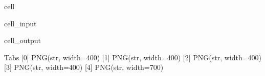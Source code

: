 \documentclass[letterpaper,10pt,english]{jupyterBook}
\begin{document}
\begin{sphinxuseclass}{cell}
\begin{sphinxVerbatimInput}
\begin{sphinxuseclass}{cell_input}
\end{sphinxuseclass}\end{sphinxVerbatimInput}
\begin{sphinxVerbatimOutput}

\begin{sphinxuseclass}{cell_output}
\begin{sphinxVerbatim}[commandchars=\\\{\}]
Tabs
    [0] PNG(str, width=400)
    [1] PNG(str, width=400)
    [2] PNG(str, width=400)
    [3] PNG(str, width=400)
    [4] PNG(str, width=700)
\end{sphinxVerbatim}

\end{sphinxuseclass}\end{sphinxVerbatimOutput}

\end{sphinxuseclass}
\end{document}

